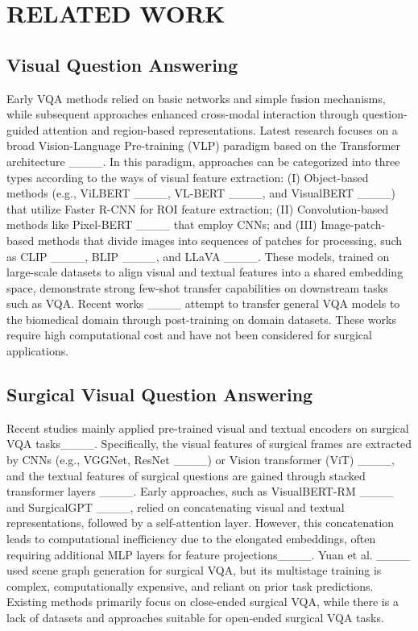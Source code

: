 \section{RELATED WORK}
\subsection{Visual Question Answering}
Early VQA methods relied on basic networks and simple fusion mechanisms, while subsequent approaches enhanced cross-modal interaction through question-guided attention and region-based representations. Latest research focuses on a broad Vision-Language Pre-training (VLP) paradigm based on the Transformer architecture ____. In this paradigm, approaches can be categorized into three types according to the ways of visual feature extraction: (I) Object-based methods (e.g., ViLBERT ____, VL-BERT ____, and VisualBERT ____) that utilize Faster R-CNN for ROI feature extraction; (II) Convolution-based methods like Pixel-BERT ____ that employ CNNs; and (III) Image-patch-based methods that divide images into sequences of patches for processing, such as CLIP ____, BLIP ____, and LLaVA ____. These models, trained on large-scale datasets to align visual and textual features into a shared embedding space, demonstrate strong few-shot transfer capabilities on downstream tasks such as VQA. Recent works ____ attempt to transfer general VQA models to the biomedical domain through post-training on domain datasets. These works require high computational cost and have not been considered for surgical applications.

\subsection{Surgical Visual Question Answering}
Recent studies mainly applied pre-trained visual and textual encoders on surgical VQA tasks____. Specifically, the visual features of surgical frames are extracted by CNNs (e.g., VGGNet, ResNet ____) or Vision transformer (ViT) ____, and the textual features of surgical questions are gained through stacked transformer layers ____. Early approaches, such as VisualBERT-RM ____ and SurgicalGPT ____, relied on concatenating visual and textual representations, followed by a self-attention layer. However, this concatenation leads to computational inefficiency due to the elongated embeddings, often requiring additional MLP layers for feature projections____. Yuan et al. ____ used scene graph generation for surgical VQA, but its multistage training is complex, computationally expensive, and reliant on prior task predictions. Existing methods primarily focus on close-ended surgical VQA, while there is a lack of datasets and approaches suitable for open-ended surgical VQA tasks.

